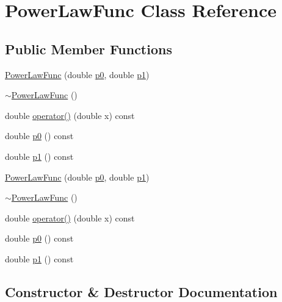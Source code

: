 \hypertarget{classPowerLawFunc}{}\section{Power\+Law\+Func Class Reference}
\label{classPowerLawFunc}
\subsection*{Public Member Functions}
\begin{DoxyCompactItemize}
\item 
\mbox{\hyperlink{classPowerLawFunc_a9b7b99c69d48448d65f76d7cc2ba3dfc}{Power\+Law\+Func}} (double \mbox{\hyperlink{classPowerLawFunc_aa1eab94d7a8d404080ed25fde7dbd889}{p0}}, double \mbox{\hyperlink{classPowerLawFunc_a99c19d6a15b5efa68b17875afc619b08}{p1}})
\item 
\mbox{\hyperlink{classPowerLawFunc_a596daf259340179e1b3dc82e00569135}{$\sim$\+Power\+Law\+Func}} ()
\item 
double \mbox{\hyperlink{classPowerLawFunc_a39c1ca06f0f0f4b7874be6fe8c67f3e3}{operator()}} (double x) const
\item 
double \mbox{\hyperlink{classPowerLawFunc_aa1eab94d7a8d404080ed25fde7dbd889}{p0}} () const
\item 
double \mbox{\hyperlink{classPowerLawFunc_a99c19d6a15b5efa68b17875afc619b08}{p1}} () const
\item 
\mbox{\hyperlink{classPowerLawFunc_a9b7b99c69d48448d65f76d7cc2ba3dfc}{Power\+Law\+Func}} (double \mbox{\hyperlink{classPowerLawFunc_aa1eab94d7a8d404080ed25fde7dbd889}{p0}}, double \mbox{\hyperlink{classPowerLawFunc_a99c19d6a15b5efa68b17875afc619b08}{p1}})
\item 
\mbox{\hyperlink{classPowerLawFunc_a596daf259340179e1b3dc82e00569135}{$\sim$\+Power\+Law\+Func}} ()
\item 
double \mbox{\hyperlink{classPowerLawFunc_a39c1ca06f0f0f4b7874be6fe8c67f3e3}{operator()}} (double x) const
\item 
double \mbox{\hyperlink{classPowerLawFunc_aa1eab94d7a8d404080ed25fde7dbd889}{p0}} () const
\item 
double \mbox{\hyperlink{classPowerLawFunc_a99c19d6a15b5efa68b17875afc619b08}{p1}} () const
\end{DoxyCompactItemize}


\subsection{Constructor \& Destructor Documentation}
\mbox{\label{classPowerLawFunc_a9b7b99c69d48448d65f76d7cc2ba3dfc}} 
